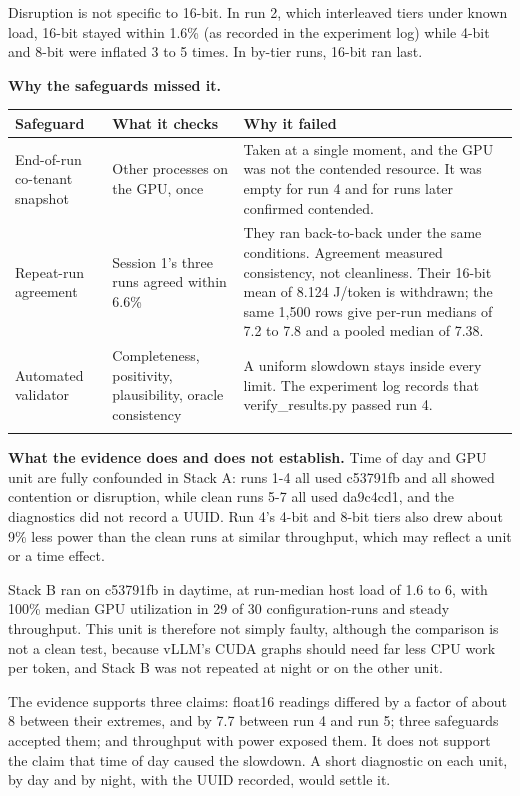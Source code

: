 Disruption is not specific to 16-bit. In run 2, which interleaved tiers under known load, 16-bit stayed within 1.6\% (as recorded in the experiment log) while 4-bit and 8-bit were inflated 3 to 5 times. In by-tier runs, 16-bit ran last.

\textbf{Why the safeguards missed it.}


\begingroup\footnotesize\setlength{\tabcolsep}{4pt}
\begin{longtable}{>{\raggedright\arraybackslash}p{34.7mm}>{\raggedright\arraybackslash}p{46.5mm}>{\raggedright\arraybackslash}p{60.4mm}}
\toprule
\textbf{Safeguard} & \textbf{What it checks} & \textbf{Why it failed} \\
\midrule
\endhead
End-of-run co-tenant snapshot & Other processes on the GPU, once & Taken at a single moment, and the GPU was not the contended resource. It was empty for run 4 and for runs later confirmed contended. \\*
Repeat-run agreement & Session 1's three runs agreed within 6.6\% & They ran back-to-back under the same conditions. Agreement measured consistency, not cleanliness. Their 16-bit mean of 8.124 J/token is withdrawn; the same 1,500 rows give per-run medians of 7.2 to 7.8 and a pooled median of 7.38. \\*
Automated validator & Completeness, positivity, plausibility, oracle consistency & A uniform slowdown stays inside every limit. The experiment log records that verify\_\allowbreak{}results.py passed run 4. \\*
\bottomrule\noalign{\nobreak}
\end{longtable}
\addtocounter{table}{-1}
\endgroup

\textbf{What the evidence does and does not establish.} Time of day and GPU unit are fully confounded in Stack A: runs 1-4 all used c53791fb and all showed contention or disruption, while clean runs 5-7 all used da9c4cd1, and the diagnostics did not record a UUID. Run 4's 4-bit and 8-bit tiers also drew about 9\% less power than the clean runs at similar throughput, which may reflect a unit or a time effect.

Stack B ran on c53791fb in daytime, at run-median host load of 1.6 to 6, with 100\% median GPU utilization in 29 of 30 configuration-runs and steady throughput. This unit is therefore not simply faulty, although the comparison is not a clean test, because vLLM's CUDA graphs should need far less CPU work per token, and Stack B was not repeated at night or on the other unit.

The evidence supports three claims: float16 readings differed by a factor of about 8 between their extremes, and by 7.7 between run 4 and run 5; three safeguards accepted them; and throughput with power exposed them. It does not support the claim that time of day caused the slowdown. A short diagnostic on each unit, by day and by night, with the UUID recorded, would settle it.

